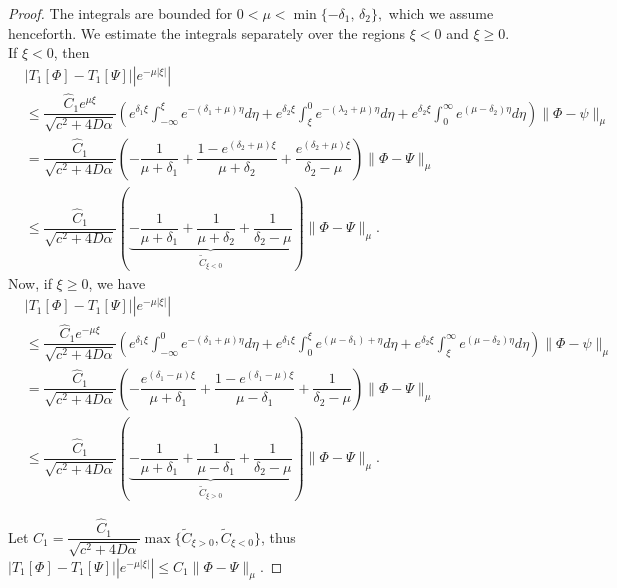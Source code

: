 \documentclass[11pt]{article}
\theoremstyle{definition}
\begin{document}
{\begin{proof}
The integrals are bounded for 
$0 < \mu < \min\{-\delta_1,\, \delta_2\},$
which we assume henceforth. We estimate the integrals separately over the regions 
$\xi < 0$ and $\xi \ge 0$. If $\xi < 0$, then 
\begin{align}
     &  |T_1[\Phi]-T_1[\Psi]||e^{- \mu |\xi|}| \\ &\le\dfrac{\widehat{C}_1 e^{\mu \xi}}{\sqrt{c^2+ 4 D \alpha}}\left( e^{\delta_1 \xi}\int_{- \infty}^{\xi}e^{-(\delta_1+ \mu)\eta} d \eta 
 + e^{\delta_2 \xi}\int_{\xi}^{0 }e^{-(\lambda_2+ \mu)\eta} d \eta + e^{\delta_2 \xi}\int_{0}^{\infty }e^{(\mu-\delta_2)\eta} d \eta\right)\|\Phi-\psi\|_\mu    \\ &= \dfrac{\widehat{C}_1}{\sqrt{c^2+4 D \alpha}} \left( - \dfrac{1}{\mu + \delta_1}+ \dfrac{1-e^{{(\delta_2+\mu)\xi}}}{\mu+ \delta_2}+ \dfrac{e^{(\delta_2+\mu)\xi}}{\delta_2- \mu} \right) \|\Phi-\Psi\|_\mu \\ &\le   \dfrac{\widehat{C}_1}{\sqrt{c^2+4 D \alpha}} \left(\underbrace{ - \dfrac{1}{\mu + \delta_1}+ \dfrac{1}{\mu+ \delta_2}+ \dfrac{1}{\delta_2- \mu}}_{\tilde C_{\xi <0}} \right) \|\Phi-\Psi\|_\mu.
\end{align}
Now, if $\xi \geq 0$, we have \begin{align}
     &  |T_1[\Phi]-T_1[\Psi]||e^{- \mu |\xi|}| \\&\le\dfrac{\widehat{C}_1 e^{-\mu \xi}}{\sqrt{c^2+ 4 D \alpha}}\left( e^{\delta_1 \xi}\int_{- \infty}^{0}e^{-(\delta_1+ \mu)\eta} d \eta 
 + e^{\delta_1 \xi}\int_{0}^{\xi }e^{(\mu-\delta_1)+ \eta} d \eta + e^{\delta_2 \xi}\int_{\xi}^{\infty }e^{(\mu-\delta_2)\eta} d \eta\right)\|\Phi-\psi\|_\mu    \\ &= \dfrac{\widehat{C}_1}{\sqrt{c^2+4 D \alpha}} \left( - \dfrac{e^{(\delta_1-\mu)\xi}}{\mu + \delta_1}+ \dfrac{1-e^{{(\delta_1-\mu)\xi}}}{\mu- \delta_1}+ \dfrac{1}{\delta_2- \mu} \right) \|\Phi-\Psi\|_\mu \\ &\le   \dfrac{\widehat{C}_1}{\sqrt{c^2+4 D \alpha}} \left(\underbrace{ - \dfrac{1}{\mu + \delta_1}+ \dfrac{1}{\mu- \delta_1}+ \dfrac{1}{\delta_2- \mu}}_{\tilde C_{\xi >0}} \right) \|\Phi-\Psi\|_\mu.
\end{align}

Let $C_1=\dfrac{\widehat{C}_1}{\sqrt{c^2+4 D \alpha}}\max\{\tilde C_{\xi>0}, \tilde C_{\xi<0}\}$, thus $|T_1[\Phi]-T_1[\Psi]||e^{- \mu |\xi|}| \le C_1 \|\Phi-\Psi\|_\mu$.


\end{proof}}
\end{document}

